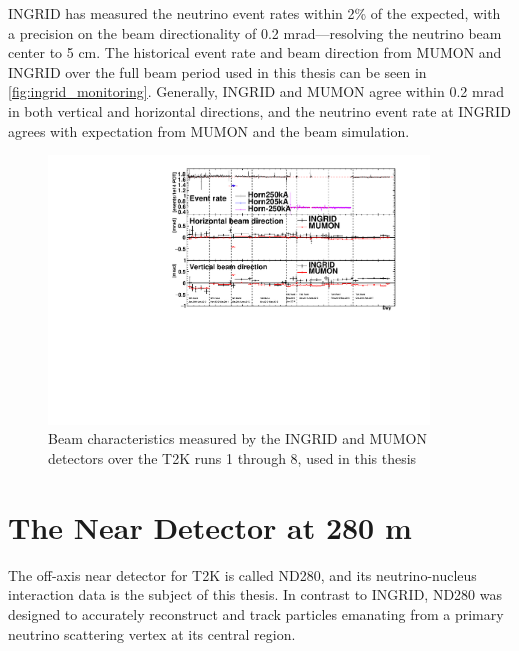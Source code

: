 INGRID has measured the neutrino event rates within 2\% of the expected\cite{t2k_2015}, with a precision on the beam directionality of 0.2 mrad---resolving the neutrino beam center to 5 cm. The historical event rate and beam direction from MUMON and INGRID over the full beam period used in this thesis can be seen in \autoref{fig:ingrid_monitoring}. Generally, INGRID and MUMON agree within 0.2 mrad in both vertical and horizontal directions, and the neutrino event rate at INGRID agrees with expectation from MUMON and the beam simulation.
\begin{figure}[h]
	\includegraphics[width=0.9\textwidth, trim={0mm 0mm 0mm 0mm}, clip,page=1]{figures/det_chap/ingrid/INGRID_official_plot_until74}
	\caption{Beam characteristics measured by the INGRID and MUMON detectors over the T2K runs 1 through 8, used in this thesis}
	\label{fig:ingrid_monitoring}
\end{figure}

\section{The Near Detector at 280 m}
\label{sec:nd280}
The off-axis near detector for T2K is called ND280, and its neutrino-nucleus interaction data is the subject of this thesis. In contrast to INGRID, ND280 was designed to accurately reconstruct and track particles emanating from a primary neutrino scattering vertex at its central region.

